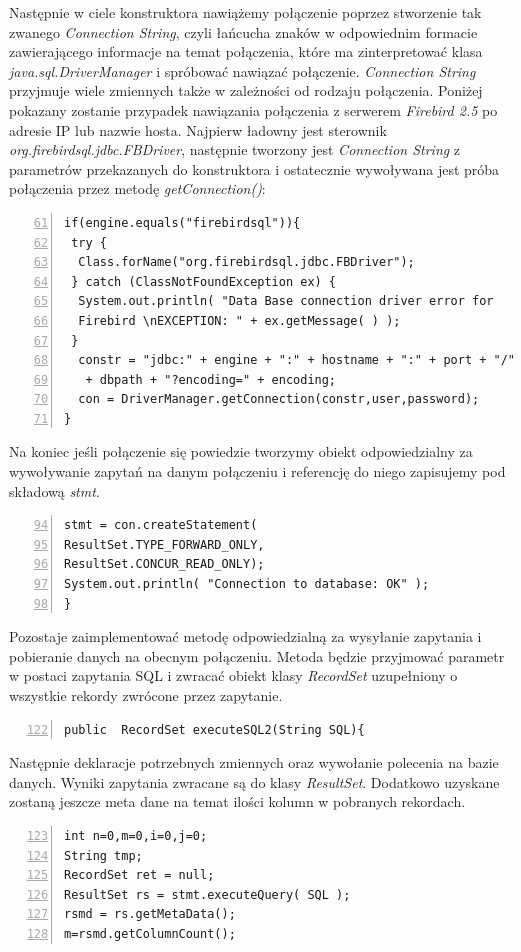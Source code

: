 Następnie w ciele konstruktora nawiążemy połączenie poprzez stworzenie tak zwanego \emph{Connection String}, czyli łańcucha znaków w odpowiednim formacie zawierającego informacje na temat połączenia, które ma zinterpretować klasa \emph{java.sql.DriverManager} i spróbować nawiązać połączenie. \emph{Connection String} przyjmuje wiele zmiennych także w zależności od rodzaju połączenia. Poniżej pokazany zostanie przypadek nawiązania połączenia z serwerem \emph{Firebird 2.5} po adresie IP lub nazwie hosta. Najpierw ładowny jest sterownik \emph{org.firebirdsql.jdbc.FBDriver}, następnie tworzony jest \emph{Connection String} z parametrów przekazanych do konstruktora i ostatecznie wywoływana jest próba połączenia przez metodę \emph{getConnection()}:
   \begin{lstlisting}[numbers=left,firstnumber=61]
if(engine.equals("firebirdsql")){
 try {
  Class.forName("org.firebirdsql.jdbc.FBDriver");
 } catch (ClassNotFoundException ex) {
  System.out.println( "Data Base connection driver error for 
  Firebird \nEXCEPTION: " + ex.getMessage( ) );
 }
  constr = "jdbc:" + engine + ":" + hostname + ":" + port + "/"
   + dbpath + "?encoding=" + encoding;
  con = DriverManager.getConnection(constr,user,password);
}
\end{lstlisting}

Na koniec jeśli połączenie się powiedzie tworzymy obiekt odpowiedzialny za wywoływanie zapytań na danym połączeniu i referencję do niego zapisujemy pod składową \emph{stmt}.
\begin{lstlisting}[numbers=left,firstnumber=94]
stmt = con.createStatement(
ResultSet.TYPE_FORWARD_ONLY,
ResultSet.CONCUR_READ_ONLY);
System.out.println( "Connection to database: OK" );
}
\end{lstlisting}

Pozostaje zaimplementować metodę odpowiedzialną za wysyłanie zapytania i pobieranie danych na obecnym połączeniu. Metoda będzie przyjmować parametr w postaci zapytania SQL i zwracać obiekt klasy \emph{RecordSet} uzupełniony o wszystkie rekordy zwrócone przez zapytanie.
\begin{lstlisting}[numbers=left,firstnumber=122]
public  RecordSet executeSQL2(String SQL){
\end{lstlisting}

Następnie deklaracje potrzebnych zmiennych oraz wywołanie polecenia na bazie danych. Wyniki zapytania zwracane są do klasy \emph{ResultSet}. Dodatkowo uzyskane zostaną jeszcze meta dane na temat ilości kolumn w pobranych rekordach. 
\begin{lstlisting}[numbers=left,firstnumber=123]
int n=0,m=0,i=0,j=0;
String tmp;
RecordSet ret = null;
ResultSet rs = stmt.executeQuery( SQL );
rsmd = rs.getMetaData();
m=rsmd.getColumnCount();
\end{lstlisting}

